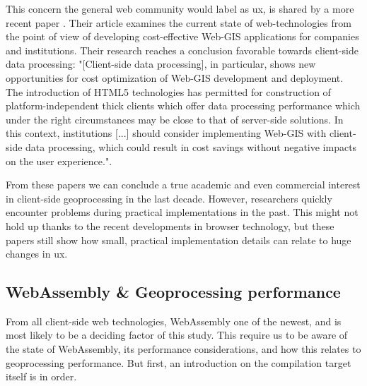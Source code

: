 This concern the general web community would label as \ac{ux}, is shared by a more recent paper \cite{kulawiak_analysis_2019}. Their article examines the current state of web-technologies from the point of view of developing cost-effective Web-GIS applications for companies and institutions. Their research reaches a conclusion favorable towards client-side data processing: "[Client-side data processing], in particular, shows new opportunities for cost optimization of Web-GIS development and deployment. The introduction of HTML5 technologies has permitted for construction of platform-independent thick clients which offer data processing performance which under the right circumstances may be close to that of server-side solutions. In this context, institutions [...] should consider implementing Web-GIS with client-side data processing, which could result in cost savings without negative impacts on the user experience.".


From these papers we can conclude a true academic and even commercial interest in client-side geoprocessing in the last decade. However, researchers quickly encounter problems during practical implementations in the past. This might not hold up thanks to the recent developments in browser technology, but these papers still show how small, practical implementation details can relate to huge changes in \ac{ux}. 


\subsection{WebAssembly \& Geoprocessing performance}

From all client-side web technologies, WebAssembly one of the newest, and is most likely to be a deciding factor of this study. This require us to be aware of the state of WebAssembly, its performance considerations, and how this relates to geoprocessing performance. But first, an introduction on the compilation target itself is in order.

